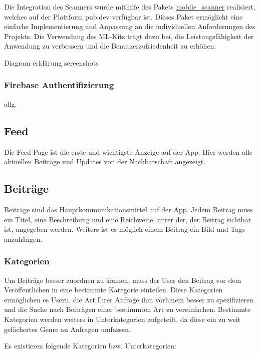 Die Integration des Scanners wurde mithilfe des Pakets \href{https://pub.dev/packages/mobile_scanner}{mobile\_scanner} realisiert, welches auf der Plattform pub.dev verfügbar ist. Dieses Paket ermöglicht eine einfache Implementierung und Anpassung an die individuellen Anforderungen des Projekts. Die Verwendung des ML-Kits trägt dazu bei, die Leistungsfähigkeit der Anwendung zu verbessern und die Benutzerzufriedenheit zu erhöhen.


Diagram
erklärung
screenshots


\subsubsection{Firebase Authentifizierung}

allg.


\subsection{Feed}
Die Feed-Page ist die erste und wichtigste Anzeige auf der App. Hier werden alle aktuellen Beiträge und Updates von der Nachbarschaft angezeigt.

\subsection{Beiträge}
Beiträge sind das Hauptkommunikationsmittel auf der App. Jedem Beitrag muss ein Titel, eine Beschreibung und eine Reichweite, unter der, der Beitrag sichtbar ist, angegeben werden. Weiters ist es möglich einem Beitrag ein Bild und Tags anzuhängen.

\subsubsection{Kategorien}
Um Beiträge besser zuordnen zu können, muss der User den Beitrag vor dem Veröffentlichen in eine bestimmte Kategorie einteilen. Diese Kategorien ermöglichen es Usern, die Art Ihrer Anfrage ihm vorhinein besser zu spezifizieren und die Suche nach Beiträgen einer bestimmten Art zu vereinfachen. Bestimmte Kategorien werden weiters in Unterkategorien aufgeteilt, da diese ein zu weit gefächertes Genre an Anfragen umfassen.

Es existieren folgende Kategorien bzw. Unterkategorien:

